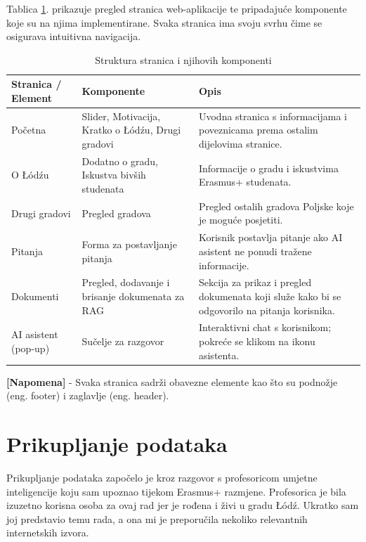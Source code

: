 \documentclass[]{foi}
\renewcommand{\arraystretch}{1.3}
\begin{document}
Tablica \ref{tab:strukturastr}. prikazuje pregled stranica web-aplikacije te pripadajuće komponente koje su na njima implementirane. Svaka stranica ima svoju
svrhu čime se osigurava intuitivna navigacija. 
\begin{table}[ht!]
\centering
\caption{Struktura stranica i njihovih komponenti}
\renewcommand{\arraystretch}{1.4}
\begin{tabular}{|>{\raggedright\arraybackslash}p{3.5cm}|>{\raggedright\arraybackslash}p{5cm}|>{\raggedright\arraybackslash}p{6.2cm}|}
\hline
\textbf{Stranica / Element} & \textbf{Komponente} & \textbf{Opis} \\
\hline
Početna & Slider, Motivacija, Kratko o Łódźu, Drugi gradovi & Uvodna stranica s informacijama i poveznicama prema ostalim dijelovima stranice. \\
\hline
O Łódźu & Dodatno o gradu, Iskustva bivših studenata & Informacije o gradu i iskustvima Erasmus+ studenata. \\
\hline
Drugi gradovi & Pregled gradova & Pregled ostalih gradova Poljske koje je moguće posjetiti. \\
\hline
Pitanja & Forma za postavljanje pitanja & Korisnik postavlja pitanje ako AI asistent ne ponudi tražene informacije. \\
\hline
Dokumenti & Pregled, dodavanje i brisanje dokumenata za RAG & Sekcija za prikaz i pregled dokumenata koji služe kako bi se odgovorilo na pitanja korisnika. \\
\hline
AI asistent (pop-up) & Sučelje za razgovor & Interaktivni chat s korisnikom; pokreće se klikom na ikonu asistenta. \\
\hline
\end{tabular}
\label{tab:strukturastr}
\end{table}

\textbf{[Napomena]} - Svaka stranica sadrži obavezne elemente kao što su podnožje (eng. footer) i zaglavlje (eng. header).

\section{Prikupljanje podataka}

Prikupljanje podataka započelo je kroz razgovor s profesoricom umjetne inteligencije koju sam upoznao tijekom Erasmus+ razmjene. 
Profesorica je bila izuzetno korisna osoba za ovaj rad jer je rođena i živi u gradu Łódź. Ukratko sam joj predstavio temu rada, 
a ona mi je preporučila nekoliko relevantnih internetskih izvora.
\end{document}
